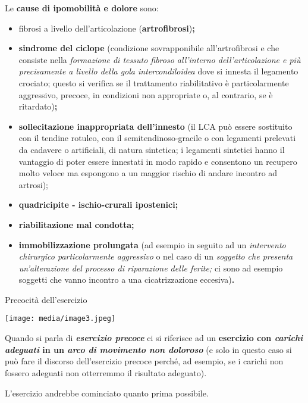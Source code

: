 \documentclass[]{article}
\begin{document}
Le \textbf{cause di ipomobilità e dolore} sono:

\begin{itemize}
\item
  fibrosi a livello dell'articolazione (\textbf{artrofibrosi})\textbf{;}
\end{itemize}

\begin{itemize}
\item
  \textbf{sindrome del ciclope} (condizione sovrapponibile
  all'artrofibrosi e che consiste nella \emph{formazione di tessuto
  fibroso all'interno dell'articolazione e più precisamente a livello
  della gola intercondiloidea} dove si innesta il legamento crociato;
  questo si verifica se il trattamento riabilitativo è particolarmente
  aggressivo, precoce, in condizioni non appropriate o, al contrario, se
  è ritardato)\textbf{;}
\item
  \textbf{sollecitazione inappropriata dell'innesto} (il LCA può essere
  sostituito con il tendine rotuleo, con il semitendinoso-gracile o con
  legamenti prelevati da cadavere o artificiali, di natura sintetica; i
  legamenti sintetici hanno il vantaggio di poter essere innestati in
  modo rapido e consentono un recupero molto veloce ma espongono a un
  maggior rischio di andare incontro ad artrosi);
\item
  \textbf{quadricipite - ischio-crurali ipostenici;}
\item
  \textbf{riabilitazione mal condotta;}
\item
  \textbf{immobilizzazione prolungata} (ad esempio in seguito ad un
  \emph{intervento chirurgico particolarmente aggressivo} o nel caso di
  un \emph{soggetto che presenta un'alterazione del processo di
  riparazione delle ferite;} ci sono ad esempio soggetti che vanno
  incontro a una cicatrizzazione eccesiva)\textbf{.}
\end{itemize}

Precocità dell'esercizio

\texttt{[image: media/image3.jpeg]}

Quando si parla di \emph{\textbf{esercizio precoce}} ci si riferisce ad
un \textbf{esercizio con \emph{carichi adeguati} in un \emph{arco di
movimento non doloroso }}(e solo in questo caso si può fare il discorso
dell'esercizio precoce perché, ad esempio, se i carichi non fossero
adeguati non otterremmo il risultato adeguato).

L'esercizio andrebbe cominciato quanto prima possibile.
\end{document}
